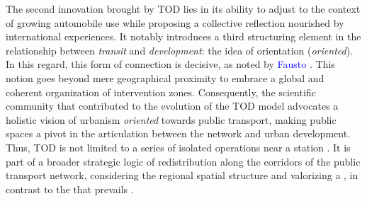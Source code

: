 \begin{refsegment}
The second innovation brought by \acrshort{TOD} lies in its ability to adjust to the context of growing automobile use while proposing a collective reflection nourished by international experiences. It notably introduces a third structuring element in the relationship between \textsl{transit} and \textsl{development}: the idea of orientation (\textsl{oriented}). In this regard, this form of connection is decisive, as noted by \textcolor{blue}{Fausto} \textcolor{blue}{\textcite[116]{lo_feudo_scenario_2014}}. This notion goes beyond mere geographical proximity to embrace a global and coherent organization of intervention zones. Consequently, the scientific community that contributed to the evolution of the \acrshort{TOD} model advocates a holistic vision of urbanism \textsl{oriented} towards public transport, making public spaces a pivot in the articulation between the network and urban development. Thus, \acrshort{TOD} is not limited to a series of isolated operations near a station \textcolor{blue}{\autocite[124]{lhostis_ville_2013}}. It is part of a broader strategic logic of redistribution along the corridors of the public transport network, considering the regional spatial structure and valorizing a , in contrast to the  that prevails \textcolor{blue}{\autocite[4-6]{mangin_ville_2004}}.%


\end{refsegment}
